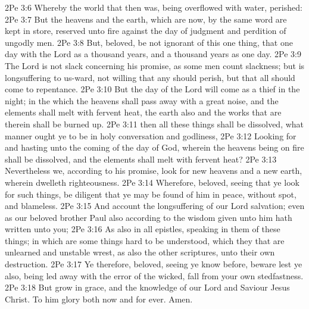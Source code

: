\vs 2Pe 3:6 Whereby the world that then was, being overflowed with water, perished:
\vs 2Pe 3:7 But the heavens and the earth, which are now, by the same word are kept in store, reserved unto fire against the day of judgment and perdition of ungodly men.
\vs 2Pe 3:8 But, beloved, be not ignorant of this one thing, that one day  with the Lord as a thousand years, and a thousand years as one day.
\vs 2Pe 3:9 The Lord is not slack concerning his promise, as some men count slackness; but is longsuffering to us-ward, not willing that any should perish, but that all should come to repentance.
\vs 2Pe 3:10 But the day of the Lord will come as a thief in the night; in the which the heavens shall pass away with a great noise, and the elements shall melt with fervent heat, the earth also and the works that are therein shall be burned up.
\vs 2Pe 3:11  then  all these things shall be dissolved, what manner  ought ye to be in  holy conversation and godliness,
\vs 2Pe 3:12 Looking for and hasting unto the coming of the day of God, wherein the heavens being on fire shall be dissolved, and the elements shall melt with fervent heat?
\vs 2Pe 3:13 Nevertheless we, according to his promise, look for new heavens and a new earth, wherein dwelleth righteousness.
\vs 2Pe 3:14 Wherefore, beloved, seeing that ye look for such things, be diligent that ye may be found of him in peace, without spot, and blameless.
\vs 2Pe 3:15 And account  the longsuffering of our Lord  salvation; even as our beloved brother Paul also according to the wisdom given unto him hath written unto you;
\vs 2Pe 3:16 As also in all  epistles, speaking in them of these things; in which are some things hard to be understood, which they that are unlearned and unstable wrest, as  also the other scriptures, unto their own destruction.
\vs 2Pe 3:17 Ye therefore, beloved, seeing ye know  before, beware lest ye also, being led away with the error of the wicked, fall from your own stedfastness.
\vs 2Pe 3:18 But grow in grace, and  the knowledge of our Lord and Saviour Jesus Christ. To him  glory both now and for ever. Amen.
